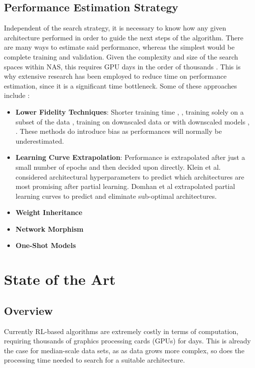 \documentclass[10pt,        %
               a4paper,     %
               journal,     %
               ]{IEEEtran}
\begin{document}
\subsection{Performance Estimation Strategy}
\label{PES}
Independent of the search strategy, it is necessary to know how any given architecture performed in order
to guide the next steps of the algorithm. There are many ways to estimate said performance, whereas the simplest
would be complete training and validation. Given the complexity and size of the search spaces within NAS, this
requires GPU days in the order of thousands \cite{wistuba2019survey}. This is why extensive research has been
employed to reduce time on performance estimation, since it is a significant time bottleneck.
Some of these approaches include \cite{wistuba2019survey}:
\begin{itemize}
    \item \textbf{Lower Fidelity Techniques}: Shorter training time \cite{zela2018towards}, \cite{zoph2018learning}, training solely on a
        subset of the data \cite{klein2018towards}, training on downscaled data \cite{chrabaszcz2017downsampled} or with downscaled
        models \cite{zoph2018learning}, \cite{pmlr-v70-real17a}. These methods do introduce bias as performances will normally be
        underestimated.

    \item \textbf{Learning Curve Extrapolation}: Performance is extrapolated after just a small number of epochs and then
        decided upon directly. Klein et al. \cite{klein2018towards} considered architectural hyperparameters to predict which
        architectures are most promising after partial learning. Domhan et al \cite{domhan2015speeding} extrapolated partial
        learning curves to predict and eliminate sub-optimal architectures.

    \item \textbf{Weight Inheritance}

    \item \textbf{Network Morphism}

    \item \textbf{One-Shot Models}
\end{itemize}

\section{State of the Art}
\label{SOA}

\subsection{Overview}
Currently RL-based algorithms are extremely costly in terms of computation, requiring thousands of
graphics processing cards (GPUs) for days. This is already the case for median-scale data sets, as
as data grows more complex, so does the processing time needed to search for a suitable architecture.
\end{document}
